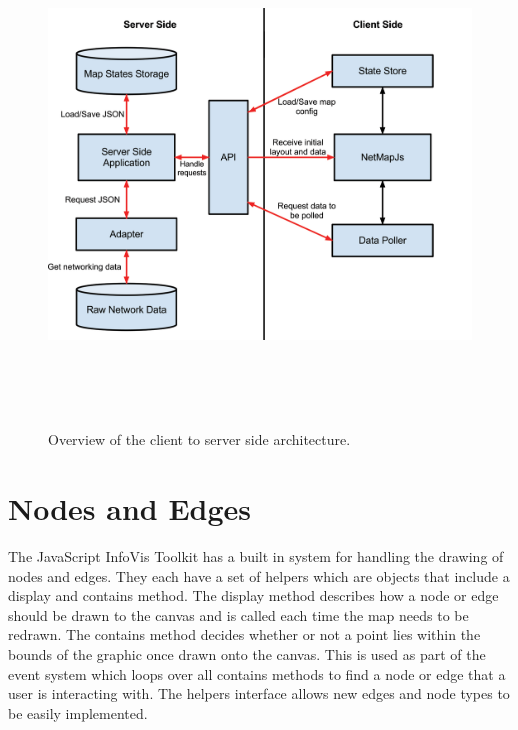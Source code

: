 \documentclass[11pt, a4paper]{report}
\begin{document}
\begin{figure}
\centering
\includegraphics[width=170mm,height=133.26mm]{assets/implementation-overview.pdf}
\caption{Overview of the client to server side architecture.}
\label{fig:implementation-overview}
\end{figure}

\section{Nodes and Edges}
\label{sec:nodes-and-edges.impl}

The JavaScript InfoVis Toolkit has a built in system for handling the drawing of
nodes and edges. They each have a set of helpers which are objects that include
a display and contains method. The display method describes how a node or edge
should be drawn to the canvas and is called each time the map needs to be
redrawn. The contains method decides whether or not a point lies within the
bounds of the graphic once drawn onto the canvas. This is used as part of the
event system which loops over all contains methods to find a node or edge that a
user is interacting with. The helpers interface allows new edges and node types
to be easily implemented.
\end{document}

